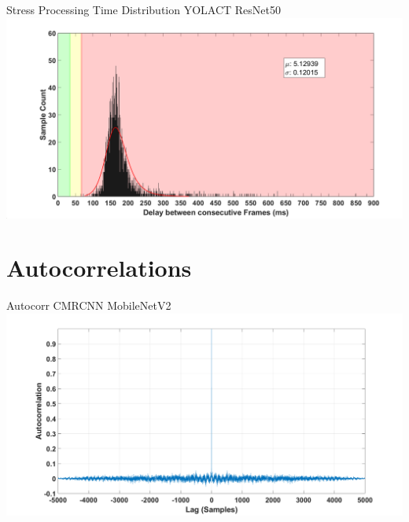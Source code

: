 \documentclass[18pt]{beamer}
\begin{document}
\begin{frame}{Stress Processing Time Distribution YOLACT ResNet50}
\includegraphics[width=\textwidth]{figures/graphs/dist_stress_yolact_resnet50.png}
\end{frame}

\section{Autocorrelations}

\begin{frame}{Autocorr CMRCNN MobileNetV2}
    \includegraphics[width=\textwidth]{figures/graphs/autocorr_cmrcnn_mobilenetv2.png}
\end{frame}
\end{document}

